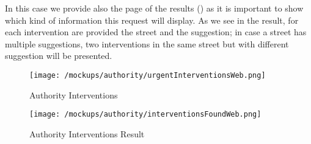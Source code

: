 				In this case we provide also the page of the results () as it is important to show which kind of information this request will display. As we see in the result, for each intervention are provided the street and the suggestion; in case a street has multiple suggestions, two interventions in the same street but with different suggestion will be presented.
				
				\vspace{0.4cm}				
				
				\begin{figure}[ht!]
					\centering
					\texttt{[image: /mockups/authority/urgentInterventionsWeb.png]}
					\caption{\label{fig:urgentInterventionsWeb} Authority Interventions}
				\end{figure}
			
				\begin{figure}[ht!]
					\centering
					\texttt{[image: /mockups/authority/interventionsFoundWeb.png]}
					\caption{\label{fig:interventionsFoundWeb} Authority Interventions Result}
				\end{figure}